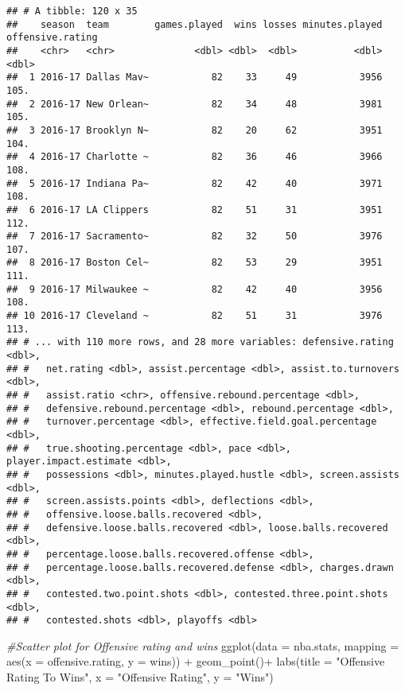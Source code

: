 \documentclass[
]{article}
\newenvironment{Shaded}{\begin{snugshade}}{\end{snugshade}}
\newcommand{\AttributeTok}[1]{\textcolor[rgb]{0.77,0.63,0.00}{#1}}
\newcommand{\CommentTok}[1]{\textcolor[rgb]{0.56,0.35,0.01}{\textit{#1}}}
\newcommand{\FunctionTok}[1]{\textcolor[rgb]{0.00,0.00,0.00}{#1}}
\newcommand{\NormalTok}[1]{#1}
\newcommand{\SpecialCharTok}[1]{\textcolor[rgb]{0.00,0.00,0.00}{#1}}
\newcommand{\StringTok}[1]{\textcolor[rgb]{0.31,0.60,0.02}{#1}}
\begin{document}
\begin{verbatim}
## # A tibble: 120 x 35
##    season  team        games.played  wins losses minutes.played offensive.rating
##    <chr>   <chr>              <dbl> <dbl>  <dbl>          <dbl>            <dbl>
##  1 2016-17 Dallas Mav~           82    33     49           3956             105.
##  2 2016-17 New Orlean~           82    34     48           3981             105.
##  3 2016-17 Brooklyn N~           82    20     62           3951             104.
##  4 2016-17 Charlotte ~           82    36     46           3966             108.
##  5 2016-17 Indiana Pa~           82    42     40           3971             108.
##  6 2016-17 LA Clippers           82    51     31           3951             112.
##  7 2016-17 Sacramento~           82    32     50           3976             107.
##  8 2016-17 Boston Cel~           82    53     29           3951             111.
##  9 2016-17 Milwaukee ~           82    42     40           3956             108.
## 10 2016-17 Cleveland ~           82    51     31           3976             113.
## # ... with 110 more rows, and 28 more variables: defensive.rating <dbl>,
## #   net.rating <dbl>, assist.percentage <dbl>, assist.to.turnovers <dbl>,
## #   assist.ratio <chr>, offensive.rebound.percentage <dbl>,
## #   defensive.rebound.percentage <dbl>, rebound.percentage <dbl>,
## #   turnover.percentage <dbl>, effective.field.goal.percentage <dbl>,
## #   true.shooting.percentage <dbl>, pace <dbl>, player.impact.estimate <dbl>,
## #   possessions <dbl>, minutes.played.hustle <dbl>, screen.assists <dbl>,
## #   screen.assists.points <dbl>, deflections <dbl>,
## #   offensive.loose.balls.recovered <dbl>,
## #   defensive.loose.balls.recovered <dbl>, loose.balls.recovered <dbl>,
## #   percentage.loose.balls.recovered.offense <dbl>,
## #   percentage.loose.balls.recovered.defense <dbl>, charges.drawn <dbl>,
## #   contested.two.point.shots <dbl>, contested.three.point.shots <dbl>,
## #   contested.shots <dbl>, playoffs <dbl>
\end{verbatim}

\begin{Shaded}
\begin{Highlighting}[]
\CommentTok{\#Scatter plot for Offensive rating and wins}
\FunctionTok{ggplot}\NormalTok{(}\AttributeTok{data =}\NormalTok{ nba.stats, }\AttributeTok{mapping =} \FunctionTok{aes}\NormalTok{(}\AttributeTok{x =}\NormalTok{ offensive.rating, }\AttributeTok{y =}\NormalTok{ wins)) }\SpecialCharTok{+}
  \FunctionTok{geom\_point}\NormalTok{()}\SpecialCharTok{+}
  \FunctionTok{labs}\NormalTok{(}\AttributeTok{title =} \StringTok{"Offensive Rating To Wins"}\NormalTok{, }\AttributeTok{x =} \StringTok{"Offensive Rating"}\NormalTok{, }\AttributeTok{y =} \StringTok{"Wins"}\NormalTok{)}
\end{Highlighting}
\end{Shaded}
\end{document}

